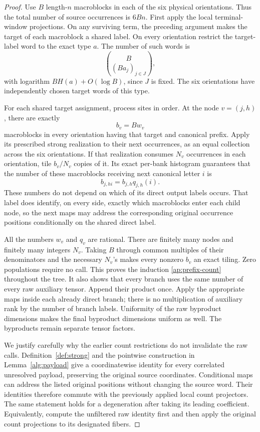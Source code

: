 \documentclass[11pt]{article}
\numberwithin{equation}{section}
\theoremstyle{definition}
\theoremstyle{remark}
\begin{document}
\begin{proof}
Use \(B\) length-\(n\) macroblocks in each of the six physical
orientations.  Thus the total number of source occurrences is \(6Bn\).
First apply the local terminal-window projections.  On any surviving
term, the preceding argument makes the target of each macroblock a
shared label.  On every orientation restrict the target-label word to
the exact type \(a\).  The number of such words is
\[
 \binom B{(Ba_j)_{j\in J}},
\]
with logarithm \(BH(a)+O(\log B)\), since \(J\) is fixed.  The
six orientations have independently chosen target words of this type.

For each shared target assignment, process sites in order.  At the node
\(v=(j,h)\), there are exactly
\[
 b_v=Bw_v
\]
macroblocks in every orientation having that target and canonical prefix.
Apply its prescribed strong realization to their next occurrences, as an
equal collection across the six orientations.  If that realization consumes
\(N_v\) occurrences in each orientation, tile \(b_v/N_v\) copies of
it.  Its exact per-bank histogram guarantees that the number of these
macroblocks receiving next canonical letter \(i\) is
\begin{equation}\label{ap:prefix-count}
 b_{j,hi}=b_{j,h}q_{j,h}(i).
\end{equation}
These numbers do not depend on which of its direct output labels occurs.
That label does identify, on every side, exactly which macroblocks enter
each child node, so the next maps may address the corresponding original
occurrence positions conditionally on the shared direct label.

All the numbers \(w_v\) and \(q_v\) are rational.  There are finitely
many nodes and finitely many integers \(N_v\).  Taking \(B\) through
common multiples of their denominators and the necessary \(N_v\)'s
makes every nonzero \(b_v\) an exact tiling.  Zero populations require
no call.  This proves the induction \eqref{ap:prefix-count} throughout
the tree.  It also shows that every branch uses the same number of every
raw auxiliary tensor.  Append their product once.  Apply the appropriate
maps inside each already direct branch; there is no multiplication of
auxiliary rank by the number of branch labels.  Uniformity of the raw
byproduct dimensions makes the final byproduct dimensions uniform as
well.  The byproducts remain separate tensor factors.

We justify carefully why the earlier count restrictions do not invalidate
the raw calls.  Definition~\ref{def:strong} and the pointwise construction
in Lemma~\ref{alg:payload} give a coordinatewise
identity for every correlated unresolved payload, preserving the original
source coordinates.  Conditional maps can address the listed original
positions without changing the source word.  Their identities therefore
commute with the previously applied local count projectors.  The same
statement holds for a degeneration after taking its leading coefficient.
Equivalently, compute the unfiltered raw identity first and then apply
the original count projections to its designated fibers.


\end{proof}
\end{document}
